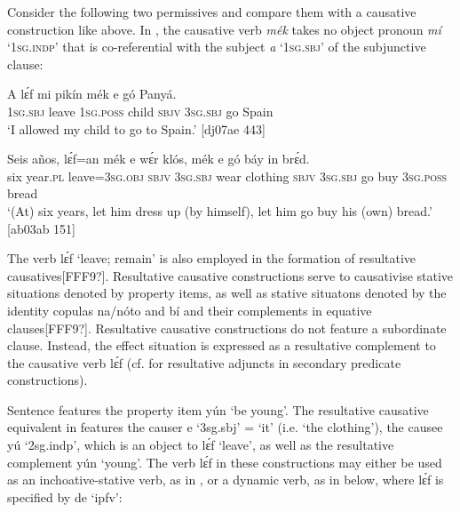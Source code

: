 Consider the following two permissives and compare them with a causative construction like  above. In , the causative verb \textit{mék} takes no object pronoun \textit{mí} ‘\textsc{1sg.indp}’ that is co-referential with the subject \textit{a} ‘\textsc{1sg.sbj’} of the subjunctive clause: 



\ea%
    \label{ex:key:1332}
    \gll A    lɛ́f    mi    pikín  mék    e    gó  Panyá. \\
\textsc{1sg.sbj}  leave  \textsc{1sg.poss}  child  \textsc{sbjv}    \textsc{3sg.sbj}  go  Spain\\

\glt ‘I allowed my child to go to Spain.’ [dj07ae 443]
\z


\ea%
    \label{ex:key:1333}
    \gll Seis  años,  lɛ́f=an    mék    e    wɛ́r    klós,
mék    e    gó  báy  in    brɛ́d.\\
six  year.\textsc{pl}  leave=\textsc{3sg.obj}  \textsc{sbjv}    \textsc{3sg.sbj}  wear  clothing
\textsc{sbjv}    \textsc{3sg.sbj}  go  buy  \textsc{3sg.poss}  bread\\

\glt ‘(At) six years, let him dress up (by himself), let him go buy his (own) bread.’ [ab03ab 151]
\z

The verb lɛ́f ‘leave; remain’ is also employed in the formation of resultative causatives[FFF9?]. Resultative causative constructions serve to causativise stative situations denoted by property items, as well as stative situatons denoted by the identity copulas na/nóto and bí and their complements in equative clauses[FFF9?]. Resultative causative constructions do not feature a subordinate clause. Instead, the effect situation is expressed as a resultative complement to the causative verb lɛ́f (cf.  for resultative adjuncts in secondary predicate constructions).


Sentence  features the property item yún ‘be young’. The resultative causative equivalent in  features the causer e ‘3sg.sbj’ = ‘it’ (i.e. ‘the clothing’), the causee yú ‘2sg.indp’, which is an object to lɛ́f ‘leave’, as well as the resultative complement yún ‘young’. The verb lɛ́f in these constructions may either be used as an inchoative-stative verb, as in , or a dynamic verb, as in  below, where lɛ́f is specified by de ‘ipfv’: 



